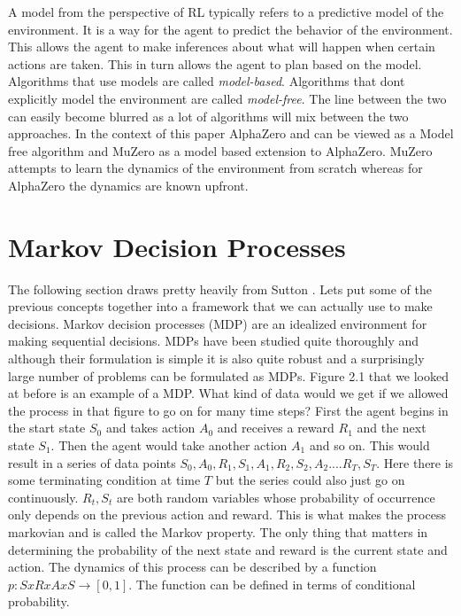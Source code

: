     A model from the perspective of RL typically refers to a predictive model of the environment. It is a way for the agent to predict the behavior of the environment. This allows the agent to make inferences about what will happen when certain actions are taken. This in turn allows the agent to plan based on the model. Algorithms that use models are called \textit{model-based}. Algorithms that dont explicitly model the environment are called \textit{model-free}. The line between the two can easily become blurred as a lot of algorithms will mix between the two approaches. In the context of this paper AlphaZero and can be viewed as a Model free algorithm and MuZero as a model based extension to AlphaZero. MuZero attempts to learn the dynamics of the environment from scratch whereas for AlphaZero the dynamics are known upfront.  


\section{Markov Decision Processes}

The following section draws pretty heavily from Sutton \cite{sutton}. Lets put some of the previous concepts together into a framework that we can actually use to make decisions. Markov decision processes (MDP) are an idealized environment for making sequential decisions. MDPs have been studied quite thoroughly and although their formulation is simple it is also quite robust and a surprisingly large number of problems can be formulated as MDPs. Figure 2.1 that we looked at before is an example of a MDP. What kind of data would we get if we allowed the process in that figure to go on for many time steps? First the agent begins in the start state $S_{0}$ and takes action $A_{0}$ and receives a reward $R_{1}$ and the next state $S_{1}$. Then the agent would take another action $A_{1}$ and so on. This would result in a series of data points $S_{0},A_{0},R_{1},S_{1},A_{1},R_{2},S_{2},A_{2}....R_{T},S_{T}$. Here there is some terminating condition at time $T$ but the series could also just go on continuously. $R_{t},S_{t}$ are both random variables whose probability of occurrence only depends on the previous action and reward. This is what makes the process markovian and is called the Markov property. The only thing that matters in determining the probability of the next state and reward is the current state and action. The dynamics of this process can be described by a function $p: S x R x A x S \rightarrow [0,1] $. The function can be defined in terms of conditional probability. 

